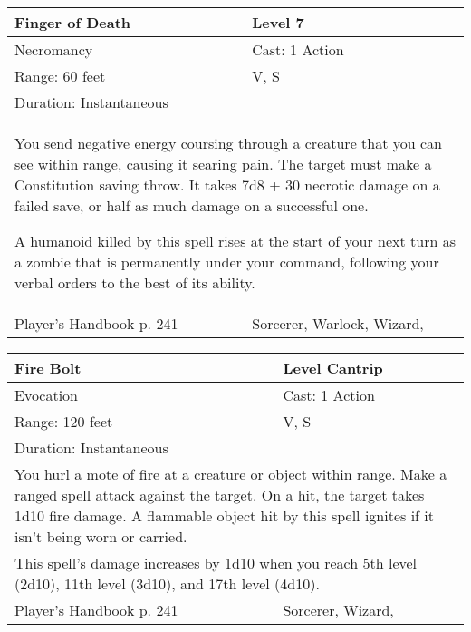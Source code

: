 \documentclass[11pt]{report}
\begin{document}
\begin{table}[H]
	\begin{tabular}{||p{6cm}|p{6cm}||}
		\hline\hline
		\bf{Finger of Death} & Level 7\\ \hline
		Necromancy & Cast: 1 Action\\ \hline
		Range: 60 feet & V, S\\ \hline
		Duration: Instantaneous & \\ \hline
		\multicolumn{2}{||p{12cm}||}{You send negative energy coursing through a creature that you can see within range, causing it searing pain.
The target must make a Constitution saving throw. It takes 7d8 + 30 necrotic damage on a failed save, or half as much damage on a successful one.

A humanoid killed by this spell rises at the start of your next turn as a zombie that is permanently under your command, following your verbal orders to the best of its ability.}\\ \hline
Player's Handbook p. 241 & Sorcerer, Warlock, Wizard, \\ \hline\hline
	\end{tabular}
\end{table}

\begin{table}[H]
	\begin{tabular}{||p{6cm}|p{6cm}||}
		\hline\hline
		\bf{Fire Bolt} & Level Cantrip\\ \hline
		Evocation & Cast: 1 Action\\ \hline
		Range: 120 feet & V, S\\ \hline
		Duration: Instantaneous & \\ \hline
		\multicolumn{2}{||p{12cm}||}{You hurl a mote of fire at a creature or object within range. Make a ranged spell attack against the target. On a hit, the target takes 1d10 fire damage. A flammable object hit by this spell ignites if it isn’t being worn or carried.}\\ \hline
		\multicolumn{2}{||p{12cm}||}{This spell’s damage increases by 1d10 when you reach 5th level (2d10), 11th level (3d10), and 17th level (4d10).}\\ \hline
Player's Handbook p. 241 & Sorcerer, Wizard, \\ \hline\hline
	\end{tabular}
\end{table}
\end{document}
